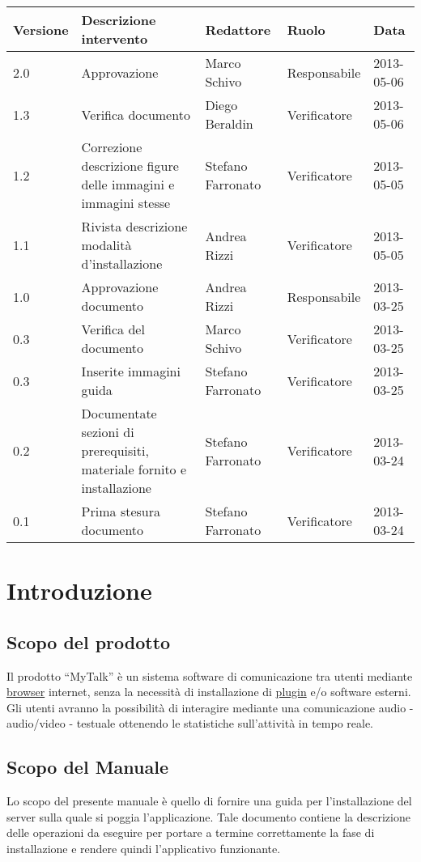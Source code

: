 \begin{tabularx}{\textwidth}{lXlll}
\toprule
Versione & Descrizione intervento & Redattore & Ruolo & Data\\
\midrule %
2.0 & Approvazione & Marco Schivo & Responsabile & 2013-05-06\\
1.3 & Verifica documento & Diego Beraldin & Verificatore & 2013-05-06\\
1.2 & Correzione descrizione figure delle immagini e immagini stesse & Stefano Farronato & Verificatore & 2013-05-05\\
1.1 & Rivista descrizione modalità d'installazione & Andrea Rizzi & Verificatore & 2013-05-05\\
1.0 & Approvazione documento& Andrea Rizzi & Responsabile & 2013-03-25\\
0.3 & Verifica del documento & Marco Schivo & Verificatore & 2013-03-25\\
0.3 & Inserite immagini guida& Stefano Farronato & Verificatore & 2013-03-25\\
0.2 & Documentate sezioni  di prerequisiti, materiale fornito e installazione& Stefano Farronato & Verificatore & 2013-03-24\\
0.1 & Prima stesura documento & Stefano Farronato & Verificatore & 2013-03-24\\
\bottomrule
\end{tabularx}
\newpage



\setcounter{page}{1}
\pagestyle{normal}

\section{Introduzione}
\subsection{Scopo del prodotto}
Il prodotto ``MyTalk'' è un sistema software di comunicazione tra utenti mediante \underline{browser} internet, senza la necessità di installazione di \underline{plugin} e/o software esterni. Gli utenti avranno la possibilità di interagire mediante una comunicazione audio - audio/video - testuale ottenendo le statistiche sull'attività in tempo reale.

\subsection{Scopo del Manuale}
Lo scopo del presente manuale è quello di fornire una guida per l'installazione del server sulla quale si poggia l'applicazione. Tale documento contiene la descrizione delle operazioni da eseguire per portare a termine correttamente la fase di installazione e rendere quindi l'applicativo funzionante.


